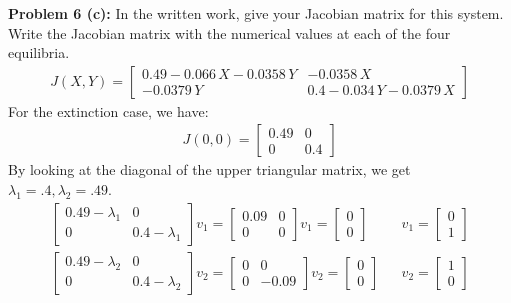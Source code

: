 \documentclass[12pt]{article}
\begin{document}
\newpage 

\noindent \textbf{Problem 6 (c): }In the written work, give your Jacobian matrix for this system. Write the Jacobian matrix with the numerical values at each of the four equilibria. 
	\begin{align*}
		J(X,Y) = 
		\begin{bmatrix}
			 0.49- 0.066\,X - 0.0358\,Y & - 0.0358\,X \\
			 - 0.0379\,Y &  0.4- 0.034\,Y- 0.0379\,X
		\end{bmatrix}
	\end{align*}
For the extinction case, we have:
	\begin{align*}
		J(0,0) = 
		\begin{bmatrix}
			0.49 & 0 \\
			0 & 0.4
		\end{bmatrix}
	\end{align*}
By looking at the diagonal of the upper triangular matrix, we get $\lambda_1 = .4, \lambda_2 = .49$.
	\begin{align*}
		\begin{bmatrix}
		0.49 - \lambda_1 & 0 \\
		0 & 0.4 - \lambda_1
		\end{bmatrix}v_1 = 
		\begin{bmatrix}
		0.09 & 0 \\
		0 & 0
		\end{bmatrix}v_1 = 
		\begin{bmatrix}
			0 \\ 0
		\end{bmatrix} && 
		v_1 = 
		\begin{bmatrix}
			0 \\ 1
		\end{bmatrix} \\
		\begin{bmatrix}
		0.49 - \lambda_2 & 0 \\
		0 & 0.4 - \lambda_2
		\end{bmatrix}v_2 = 
		\begin{bmatrix}
		0 & 0 \\
		0 & -0.09
		\end{bmatrix}v_2 = 
		\begin{bmatrix}
		0 \\ 0
		\end{bmatrix} && 
		v_2 = 
		\begin{bmatrix}
		1 \\ 0
		\end{bmatrix}
	\end{align*}
\end{document}
